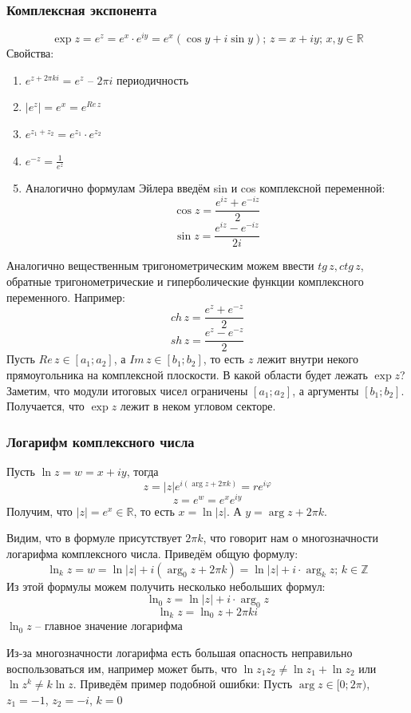 \documentclass[twoside]{book}
\begin{document}
\subsubsection{Комплексная экспонента}
$$\exp{z}=e^z=e^x \cdot e^{iy}=e^x(\cos{y}+i\sin{y}); \,z = x + iy;\,x, y\in\mathbb{R}$$
Свойства:
\begin{enumerate}
    \item $e^{z + 2\pi ki} = e^z$ -- $2\pi i$ периодичность
    \item $|e^z| = e^x=e^{Re\,z}$
    \item $e^{z_1 + z_2} = e^{z_1} \cdot e^{z_2}$
    \item $e^{-z} = \frac{1}{e^z}$
    \item Аналогично формулам Эйлера введём sin и cos комплексной переменной:
          $$\cos{z}=\frac{e^{iz}+e^{-iz}}{2}$$
          $$\sin{z}=\frac{e^{iz}-e^{-iz}}{2i}$$
\end{enumerate}
Аналогично вещественным тригонометрическим можем ввести $tg\,z, ctg\,z$, обратные тригонометрические и гиперболические функции комплексного переменного. Например:
$$ch\,z=\frac{e^z+e^{-z}}{2}$$
$$sh\,z=\frac{e^z-e^{-z}}{2}$$
Пусть $Re\,z\in[a_1; a_2]$, а $Im\,z\in[b_1; b_2]$, то есть $z$ лежит внутри некого прямоугольника на комплексной плоскости. В какой области будет лежать $\exp{z}$? Заметим, что модули итоговых чисел ограничены $[a_1; a_2]$, а аргументы $[b_1; b_2]$. Получается, что $\exp{z}$ лежит в неком угловом секторе.
\subsubsection{Логарифм комплексного числа}
Пусть $\ln{z}=w=x+iy$, тогда
$$z=|z|e^{i(\arg{z}+2\pi k)}=re^{i\varphi}$$
$$z=e^{w}=e^x e^{iy}$$
Получим, что $|z|=e^x\in\mathbb{R}$, то есть $x=\ln{|z|}$. А $y=\arg{z}+2\pi k$.

Видим, что в формуле присутствует $2\pi k$, что говорит нам о многозначности логарифма комплексного числа. Приведём общую формулу:
$$\ln_k{z}=w=\ln{|z|}+i(\arg_0{z}+2\pi k) = \ln{|z|}+i \cdot \arg_k{z}; \, k\in\mathbb{Z}$$
Из этой формулы можем получить несколько небольших формул:
$$\ln_0{z}=\ln{|z|}+i \cdot \arg_0{z}$$
$$\ln_k{z}=\ln_0{z}+2\pi ki$$
$\ln_0{z}$ -- главное значение логарифма

Из-за многозначности логарифма есть большая опасность неправильно воспользоваться им, например может быть, что $\ln{z_1z_2}\neq\ln{z_1} + \ln{z_2}$ или $\ln{z^k}\neq k\ln{z}$.
Приведём пример подобной ошибки:
Пусть $\arg{z}\in[0;2\pi)$, $z_1=-1$, $z_2=-i$, $k=0$
\end{document}
